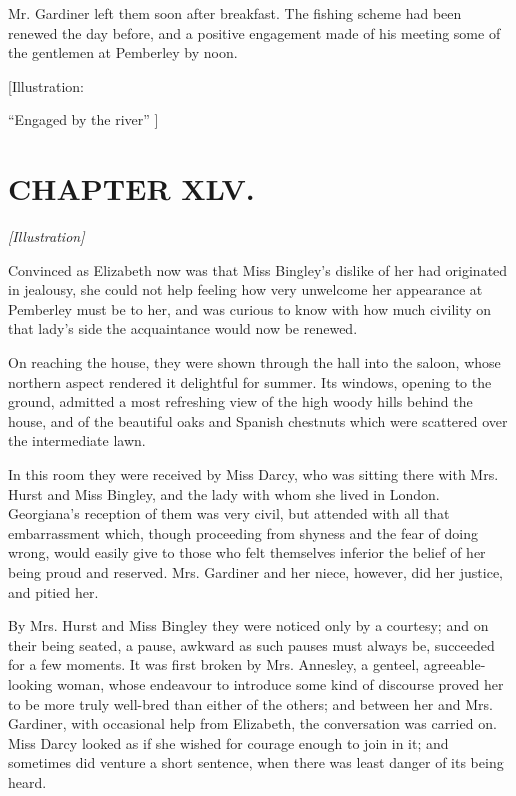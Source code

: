 \documentclass[12pt]{book}
\begin{document}
Mr. Gardiner left them soon after breakfast. The fishing scheme had been renewed the day before, and a positive engagement made of his meeting some of the gentlemen at Pemberley by noon.

[Illustration:

``Engaged by the river'' ]

\chapter{CHAPTER XLV.}

\emph{[Illustration]}

Convinced as Elizabeth now was that Miss Bingley's dislike of her had originated in jealousy, she could not help feeling how very unwelcome her appearance at Pemberley must be to her, and was curious to know with how much civility on that lady's side the acquaintance would now be renewed.

On reaching the house, they were shown through the hall into the saloon, whose northern aspect rendered it delightful for summer. Its windows, opening to the ground, admitted a most refreshing view of the high woody hills behind the house, and of the beautiful oaks and Spanish chestnuts which were scattered over the intermediate lawn.

In this room they were received by Miss Darcy, who was sitting there with Mrs. Hurst and Miss Bingley, and the lady with whom she lived in London. Georgiana's reception of them was very civil, but attended with all that embarrassment which, though proceeding from shyness and the fear of doing wrong, would easily give to those who felt themselves inferior the belief of her being proud and reserved. Mrs. Gardiner and her niece, however, did her justice, and pitied her.

By Mrs. Hurst and Miss Bingley they were noticed only by a courtesy; and on their being seated, a pause, awkward as such pauses must always be, succeeded for a few moments. It was first broken by Mrs. Annesley, a genteel, agreeable-looking woman, whose endeavour to introduce some kind of discourse proved her to be more truly well-bred than either of the others; and between her and Mrs. Gardiner, with occasional help from Elizabeth, the conversation was carried on. Miss Darcy looked as if she wished for courage enough to join in it; and sometimes did venture a short sentence, when there was least danger of its being heard.
\end{document}
